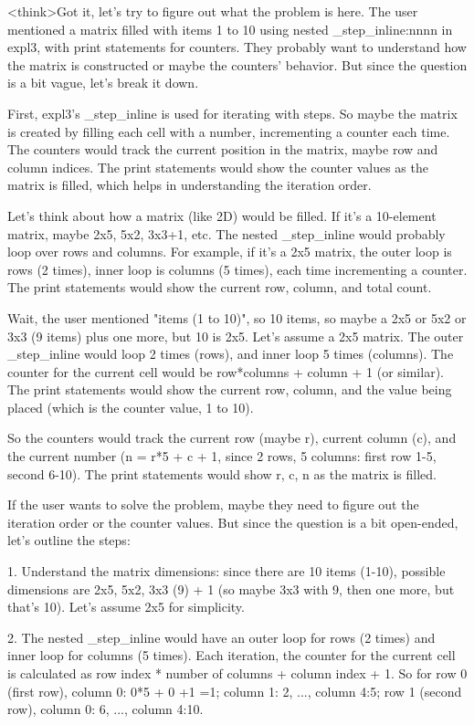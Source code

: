 <think>Got it, let's try to figure out what the problem is here. The user mentioned a matrix filled with items 1 to 10 using nested \int_step_inline:nnnn in expl3, with print statements for counters. They probably want to understand how the matrix is constructed or maybe the counters' behavior. But since the question is a bit vague, let's break it down.

First, expl3's \int_step_inline is used for iterating with steps. So maybe the matrix is created by filling each cell with a number, incrementing a counter each time. The counters would track the current position in the matrix, maybe row and column indices. The print statements would show the counter values as the matrix is filled, which helps in understanding the iteration order.

Let's think about how a matrix (like 2D) would be filled. If it's a 10-element matrix, maybe 2x5, 5x2, 3x3+1, etc. The nested \int_step_inline would probably loop over rows and columns. For example, if it's a 2x5 matrix, the outer loop is rows (2 times), inner loop is columns (5 times), each time incrementing a counter. The print statements would show the current row, column, and total count.

Wait, the user mentioned "items (1 to 10)", so 10 items, so maybe a 2x5 or 5x2 or 3x3 (9 items) plus one more, but 10 is 2x5. Let's assume a 2x5 matrix. The outer \int_step_inline would loop 2 times (rows), and inner loop 5 times (columns). The counter for the current cell would be row*columns + column + 1 (or similar). The print statements would show the current row, column, and the value being placed (which is the counter value, 1 to 10).

So the counters would track the current row (maybe r), current column (c), and the current number (n = r*5 + c + 1, since 2 rows, 5 columns: first row 1-5, second 6-10). The print statements would show r, c, n as the matrix is filled.

If the user wants to solve the problem, maybe they need to figure out the iteration order or the counter values. But since the question is a bit open-ended, let's outline the steps:

1. Understand the matrix dimensions: since there are 10 items (1-10), possible dimensions are 2x5, 5x2, 3x3 (9) + 1 (so maybe 3x3 with 9, then one more, but that's 10). Let's assume 2x5 for simplicity.

2. The nested \int_step_inline would have an outer loop for rows (2 times) and inner loop for columns (5 times). Each iteration, the counter for the current cell is calculated as row index * number of columns + column index + 1. So for row 0 (first row), column 0: 0*5 + 0 +1 =1; column 1: 2, ..., column 4:5; row 1 (second row), column 0: 6, ..., column 4:10.

